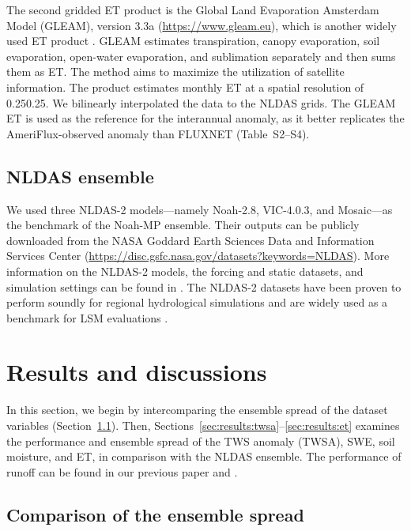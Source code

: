 \documentclass[essd, manuscript]{copernicus}
\begin{document}
The second gridded ET product is the Global Land Evaporation Amsterdam Model (GLEAM), version 3.3a (\url{https://www.gleam.eu}), which is another widely used ET product \citep{xu2019JHa}. GLEAM estimates transpiration, canopy evaporation, soil evaporation, open-water evaporation, and sublimation separately and then sums them as ET\@. The method aims to maximize the utilization of satellite information. The product estimates monthly ET at a spatial resolution of 0.25\degree{}\times{}0.25\degree{}. We bilinearly interpolated the data to the NLDAS grids. The GLEAM ET is used as the reference for the interannual anomaly, as it better replicates the AmeriFlux-observed anomaly than FLUXNET (Table~S2--S4).

\subsection{NLDAS ensemble}\label{sec:methods:nldas}

We used three NLDAS-2 models---namely Noah-2.8, VIC-4.0.3, and Mosaic---as the benchmark of the Noah-MP ensemble. Their outputs can be publicly downloaded from the NASA Goddard Earth Sciences Data and Information Services Center (\url{https://disc.gsfc.nasa.gov/datasets?keywords=NLDAS}). More information on the NLDAS-2 models, the forcing and static datasets, and simulation settings can be found in \citet{xia2012JGRA, xia2012JGRAa}. The NLDAS-2 datasets have been proven to perform soundly for regional hydrological simulations \citep{xia2012JGRA, xia2012JGRAa, xia2016JGRA, xia2015JHa, xia2015JH} and are widely used as a benchmark for LSM evaluations \citep{cai2014JGRAa, fei2021WRR}.

\section{Results and discussions}\label{sec:results}

In this section, we begin by intercomparing the ensemble spread of the dataset variables (Section~\ref{sec:results:spread}). Then, Sections~\ref{sec:results:twsa}--\ref{sec:results:et} examines the performance and ensemble spread of the TWS anomaly (TWSA), SWE, soil moisture, and ET, in comparison with the NLDAS ensemble. The performance of runoff can be found in our previous paper \citet{fei2021WRR} and \citet{zheng2020JAMES}.

\subsection{Comparison of the ensemble spread}\label{sec:results:spread}
\end{document}
